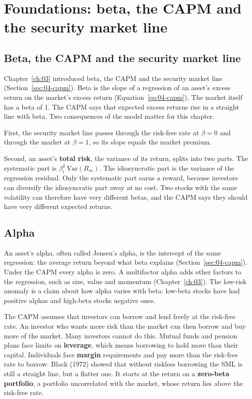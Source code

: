 \section{Foundations: beta, the CAPM and the security market line}
\label{sec:18-foundations}

\subsection{Beta, the CAPM and the security market line}

Chapter~\ref{ch:03} introduced beta, the CAPM and the security market line (Section~\ref{sec:04-capm}). Beta is the slope of a regression of an asset's excess return on the market's excess return (Equation~\eqref{eq:04-capm}). The market itself has a beta of 1. The CAPM says that expected excess returns rise in a straight line with beta. Two consequences of the model matter for this chapter.

First, the security market line passes through the risk-free rate at $\beta = 0$ and through the market at $\beta = 1$, so its slope equals the market premium.

Second, an asset's \textbf{total risk}, the variance of its return, splits into two parts. The systematic part is $\beta_i^2\,\mathrm{Var}(R_m)$. The idiosyncratic part is the variance of the regression residual. Only the systematic part earns a reward, because investors can diversify the idiosyncratic part away at no cost. Two stocks with the same volatility can therefore have very different betas, and the CAPM says they should have very different expected returns.

\subsection{Alpha}

An asset's alpha, often called Jensen's alpha, is the intercept of the same regression: the average return beyond what beta explains (Section~\ref{sec:04-capm}). Under the CAPM every alpha is zero. A multifactor alpha adds other factors to the regression, such as size, value and momentum (Chapter~\ref{ch:03}). The low-risk anomaly is a claim about how alpha varies with beta: low-beta stocks have had positive alphas and high-beta stocks negative ones.

The CAPM assumes that investors can borrow and lend freely at the risk-free rate. An investor who wants more risk than the market can then borrow and buy more of the market. Many investors cannot do this. Mutual funds and pension plans face limits on \textbf{leverage}, which means borrowing to hold more than their capital. Individuals face \textbf{margin} requirements and pay more than the risk-free rate to borrow. Black (1972) showed that without riskless borrowing the SML is still a straight line, but a flatter one. It starts at the return on a \textbf{zero-beta portfolio}, a portfolio uncorrelated with the market, whose return lies above the risk-free rate.


